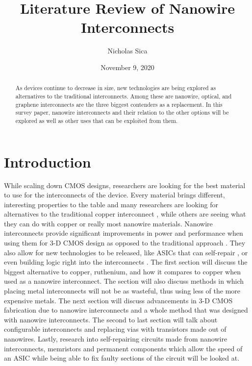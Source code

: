 \documentclass[conference]{IEEEtran}
\title{Literature Review of Nanowire Interconnects}
\author{Nicholas Sica}
\date{November 9, 2020}
\begin{document}
\maketitle

\begin{abstract}
As devices continue to decrease in size, new technologies are being explored as alternatives to the traditional interconnects.
Among these are nanowire, optical, and graphene interconnects are the three biggest contenders as a replacement.
In this survey paper, nanowire interconnects and their relation to the other options will be explored as well as other uses
that can be exploited from them.
\end{abstract}

\section{Introduction}
While scaling down CMOS designs, researchers are looking for the best material to use for the interconnects of the device.
Every material brings different, interesting properties to the table and many researchers are looking for alternatives to the
traditional copper interconnect \cite{7968937}, while others are seeing what they can do with copper or really most nanowire
materials. Nanowire interconnects provide significant improvements in power and performance when using them for 3-D CMOS
design as opposed to the traditional approach \cite{8387522}. They also allow for new technologies to be released, like
ASICs that can self-repair \cite{8423678}, or even building logic right into the interconnects \cite{5510748}. The first
section will discuss the biggest alternative to copper, ruthenium, and how it compares to copper when used as a nanowire
interconnect. The section will also discuss methods in which placing metal interconnects will not be as wasteful, thus
using less of the more expensive metals. The next section will discuss
advancements in 3-D CMOS fabrication due to nanowire interconnects and a whole method that was designed with nanowire
interconnects. The second to last section will talk about configurable interconnects and replacing vias with transistors
made out of nanowires. Lastly, research into self-repairing circuits made from nanowire interconnects, memristors and
permanent components which allow the speed of an ASIC while being able to fix faulty sections of the circuit will be looked at.
\end{document}
